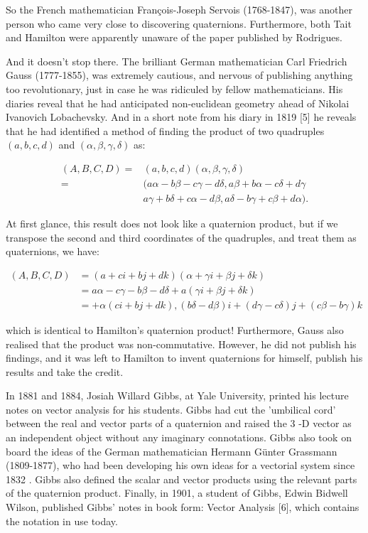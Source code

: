 \documentclass[10pt]{article}
\begin{document}
So the French mathematician François-Joseph Servois (1768-1847), was another person who came very close to discovering quaternions. Furthermore, both Tait and Hamilton were apparently unaware of the paper published by Rodrigues.

And it doesn't stop there. The brilliant German mathematician Carl Friedrich Gauss (1777-1855), was extremely cautious, and nervous of publishing anything too revolutionary, just in case he was ridiculed by fellow mathematicians. His diaries reveal that he had anticipated non-euclidean geometry ahead of Nikolai Ivanovich Lobachevsky. And in a short note from his diary in 1819 [5] he reveals that he had identified a method of finding the product of two quadruples $(a, b, c, d)$ and $(\alpha, \beta, \gamma, \delta)$ as:

$$
\begin{aligned}
(A, B, C, D)= & (a, b, c, d)(\alpha, \beta, \gamma, \delta) \\
= & (a \alpha-b \beta-c \gamma-d \delta, a \beta+b \alpha-c \delta+d \gamma \\
& a \gamma+b \delta+c \alpha-d \beta, a \delta-b \gamma+c \beta+d \alpha) .
\end{aligned}
$$

At first glance, this result does not look like a quaternion product, but if we transpose the second and third coordinates of the quadruples, and treat them as quaternions, we have:

$$
\begin{aligned}
(A, B, C, D) & =(a+c i+b j+d k)(\alpha+\gamma i+\beta j+\delta k) \\
& =a \alpha-c \gamma-b \beta-d \delta+a(\gamma i+\beta j+\delta k) \\
& =+\alpha(c i+b j+d k),(b \delta-d \beta) i+(d \gamma-c \delta) j+(c \beta-b \gamma) k
\end{aligned}
$$

which is identical to Hamilton's quaternion product! Furthermore, Gauss also realised that the product was non-commutative. However, he did not publish his findings, and it was left to Hamilton to invent quaternions for himself, publish his results and take the credit.

In 1881 and 1884, Josiah Willard Gibbs, at Yale University, printed his lecture notes on vector analysis for his students. Gibbs had cut the 'umbilical cord' between the real and vector parts of a quaternion and raised the 3 -D vector as an independent object without any imaginary connotations. Gibbs also took on board the ideas of the German mathematician Hermann Günter Grassmann (1809-1877), who had been developing his own ideas for a vectorial system since 1832 . Gibbs also defined the scalar and vector products using the relevant parts of the quaternion product. Finally, in 1901, a student of Gibbs, Edwin Bidwell Wilson, published Gibbs' notes in book form: Vector Analysis [6], which contains the notation in use today.
\end{document}
